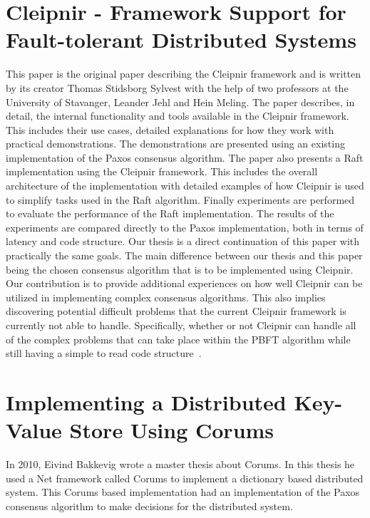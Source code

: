 \section{Cleipnir - Framework Support for Fault-tolerant Distributed Systems}
This paper is the original paper describing the Cleipnir framework and is written by its creator Thomas Stidsborg Sylvest with the help of two professors at the University of Stavanger, Leander Jehl and Hein Meling. The paper describes, in detail, the internal functionality and tools available in the Cleipnir framework. This includes their use cases, detailed explanations for how they work with practical demonstrations. The demonstrations are presented using an existing implementation of the Paxos consensus algorithm. The paper also presents a Raft implementation using the Cleipnir framework. This includes the overall architecture of the implementation with detailed examples of how Cleipnir is used to simplify tasks used in the Raft algorithm. Finally experiments are performed to evaluate the performance of the Raft implementation. The results of the experiments are compared directly to the Paxos implementation, both in terms of latency and code structure. Our thesis is a direct continuation of this paper with practically the same goals. The main difference between our thesis and this paper being the chosen consensus algorithm that is to be implemented using Cleipnir. Our contribution is to provide additional experiences on how well Cleipnir can be utilized in implementing complex consensus algorithms. This also implies discovering potential difficult problems that the current Cleipnir framework is currently not able to handle. Specifically, whether or not Cleipnir can handle all of the complex problems that can take place within the PBFT algorithm while still having a simple to read code structure~\cite{PAPER:PaxosCleipnir}.
 
\section{Implementing a Distributed Key-Value Store Using Corums}
In 2010, Eivind Bakkevig wrote a master thesis about Corums. In this thesis he used a Net framework called Corums to implement a dictionary based distributed system. This Corums based implementation had an implementation of the Paxos consensus algorithm to make decisions for the distributed system.
 
